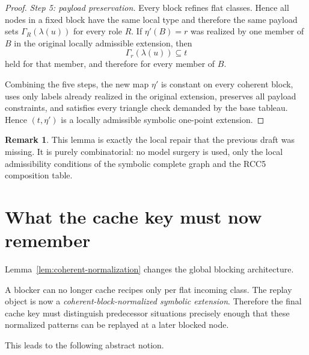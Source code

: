 \documentclass[11pt]{article}
\theoremstyle{definition}
\newtheorem{remark}[theorem]{Remark}
\begin{document}
\begin{proof}
\emph{Step 5: payload preservation.}
Every block refines flat classes. Hence all nodes in a fixed block have the same local type and therefore the same payload sets $\Gamma_R(\lambda(u))$ for every role $R$. If $\eta'(B)=r$ was realized by one member of $B$ in the original locally admissible extension, then
\[
\Gamma_r(\lambda(u))\subseteq t
\]
held for that member, and therefore for every member of $B$.

Combining the five steps, the new map $\eta'$ is constant on every coherent block, uses only labels already realized in the original extension, preserves all payload constraints, and satisfies every triangle check demanded by the base tableau. Hence $(t,\eta')$ is a locally admissible symbolic one-point extension.\qedhere
\end{proof}

\begin{remark}
This lemma is exactly the local repair that the previous draft was missing. It is purely combinatorial: no model surgery is used, only the local admissibility conditions of the symbolic complete graph and the RCC5 composition table.
\end{remark}

\section{What the cache key must now remember}

Lemma~\ref{lem:coherent-normalization} changes the global blocking architecture.

A blocker can no longer cache recipes only per flat incoming class. The replay object is now a \emph{coherent-block-normalized symbolic extension}. Therefore the final cache key must distinguish predecessor situations precisely enough that these normalized patterns can be replayed at a later blocked node.

This leads to the following abstract notion.
\end{document}
